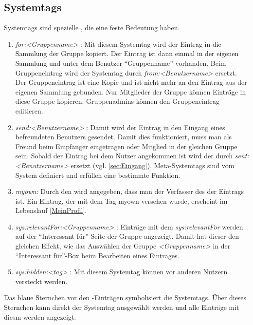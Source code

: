 \subsection{Systemtags}
\label{subsec:Systemtags}
Systemtags sind spezielle \tags, die eine feste Bedeutung haben.
\begin{enumerate}
    \item \textit{for:<Gruppenname>} : Mit diesem Systemtag wird der Eintrag in die Sammlung der Gruppe kopiert. Der Eintrag ist dann einmal in der eigenen Sammlung und unter dem Benutzer \enquote{Gruppenname} vorhanden. Beim Gruppeneintrag wird der Systemtag durch \textit{from:<Benutzername>} ersetzt. Der Gruppeneintrag ist eine Kopie und ist nicht mehr an den Eintrag aus der eigenen Sammlung gebunden. Nur Mitglieder der Gruppe können Einträge in diese Gruppe kopieren. Gruppenadmins können den Gruppeneintrag editieren.
    \item \textit{send:<Benutzername>} : Damit wird der Eintrag in den Eingang eines befreundeten Benutzers gesendet. Damit dies funktioniert, muss man als Freund beim Empfänger eingetragen oder Mitglied in der gleichen Gruppe sein. Sobald der Eintrag bei dem Nutzer angekommen ist wird der \tag durch \textit{sent:<Benutzername>} ersetzt (vgl. \autoref{sec:Eingang}).  
Meta-Systemtags sind vom System definiert und erfüllen eine bestimmte Funktion.
    \item \textit{myown:} Durch den \tag wird angegeben, dass man der Verfasser des der Eintrags ist. Ein Eintrag, der mit dem Tag myown versehen wurde, erscheint im Lebenslauf \autoref{MeinProfil}. 
    \item \textit{sys:relevantFor:<Gruppenname>} : Einträge mit dem \tag \textit{sys:relevantFor} werden auf der \enquote{Interessant für}-Seite der Gruppe angezeigt. Damit hat dieser \tag den gleichen Effekt, wie das Auswählen der Gruppe \textit{<Gruppenname>} in der \enquote{Interessant für}-Box beim Bearbeiten eines Eintrages.
    \item \textit{sys:hidden:<tag>} : Mit diesem Systemtag können \tags vor anderen Nutzern versteckt werden. 
\end{enumerate}
\begin{tip}
Das blaue Sternchen vor den \tag-Einträgen symbolisiert die Systemtags. Über dieses Sternchen kann direkt der Systemtag ausgewählt werden und alle Einträge mit diesm \tag werden angezeigt.
\end{tip}

